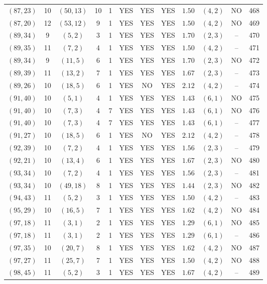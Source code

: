 \begin{longtable}{|c|c|c|c|c|c|c|c|c|c|c|c|}
$(87,23)$ & 10 & $(50,13)$ & 10 & 1 & YES & YES & YES & $1.50$ & $(4,2)$ & NO & 468\\
$(87,20)$ & 12 & $(53,12)$ & 9 & 1 & YES & YES & YES & $1.50$ & $(4,2)$ & NO & 469\\
$(89,34)$ & 9 & $(5,2)$ & 3 & 1 & YES & YES & YES & $1.70$ & $(2,3)$ & -- & 470\\
$(89,35)$ & 11 & $(7,2)$ & 4 & 1 & YES & YES & YES & $1.50$ & $(4,2)$ & -- & 471\\
$(89,34)$ & 9 & $(11,5)$ & 6 & 1 & YES & YES & YES & $1.70$ & $(2,3)$ & NO & 472\\
$(89,39)$ & 11 & $(13,2)$ & 7 & 1 & YES & YES & YES & $1.67$ & $(2,3)$ & -- & 473\\
$(89,26)$ & 10 & $(18,5)$ & 6 & 1 & YES & NO & YES & $2.12$ & $(4,2)$ & -- & 474\\
$(91,40)$ & 10 & $(5,1)$ & 4 & 1 & YES & YES & YES & $1.43$ & $(6,1)$ & NO & 475\\
$(91,40)$ & 10 & $(7,3)$ & 4 & 7 & YES & YES & YES & $1.43$ & $(6,1)$ & NO & 476\\
$(91,40)$ & 10 & $(7,3)$ & 4 & 7 & YES & YES & YES & $1.43$ & $(6,1)$ & -- & 477\\
$(91,27)$ & 10 & $(18,5)$ & 6 & 1 & YES & NO & YES & $2.12$ & $(4,2)$ & -- & 478\\
$(92,39)$ & 10 & $(7,2)$ & 4 & 1 & YES & YES & YES & $1.56$ & $(2,3)$ & -- & 479\\
$(92,21)$ & 10 & $(13,4)$ & 6 & 1 & YES & YES & YES & $1.67$ & $(2,3)$ & NO & 480\\
$(93,34)$ & 10 & $(7,2)$ & 4 & 1 & YES & YES & YES & $1.56$ & $(2,3)$ & -- & 481\\
$(93,34)$ & 10 & $(49,18)$ & 8 & 1 & YES & YES & YES & $1.44$ & $(2,3)$ & NO & 482\\
$(94,43)$ & 11 & $(5,2)$ & 3 & 1 & YES & YES & YES & $1.50$ & $(4,2)$ & -- & 483\\
$(95,29)$ & 10 & $(16,5)$ & 7 & 1 & YES & YES & YES & $1.62$ & $(4,2)$ & NO & 484\\
$(97,18)$ & 11 & $(3,1)$ & 2 & 1 & YES & YES & YES & $1.29$ & $(6,1)$ & NO & 485\\
$(97,18)$ & 11 & $(3,1)$ & 2 & 1 & YES & YES & YES & $1.29$ & $(6,1)$ & -- & 486\\
$(97,35)$ & 10 & $(20,7)$ & 8 & 1 & YES & YES & YES & $1.62$ & $(4,2)$ & NO & 487\\
$(97,27)$ & 11 & $(25,7)$ & 7 & 1 & YES & YES & YES & $1.50$ & $(4,2)$ & NO & 488\\
$(98,45)$ & 11 & $(5,2)$ & 3 & 1 & YES & YES & YES & $1.67$ & $(4,2)$ & -- & 489\\

\end{longtable}
